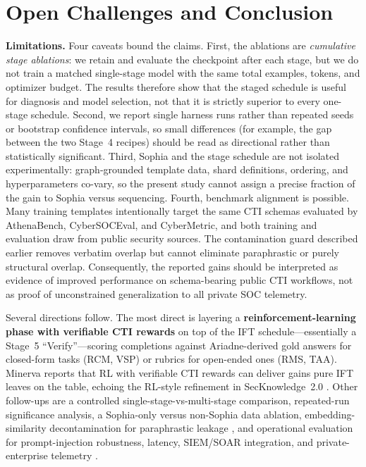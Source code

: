 \documentclass[conference]{IEEEtran}
\begin{document}
\section{Open Challenges and Conclusion}
\label{sec:open-challenges}

\textbf{Limitations.} Four caveats bound the claims. First, the ablations are \emph{cumulative stage ablations}: we retain and evaluate the checkpoint after each stage, but we do not train a matched single-stage model with the same total examples, tokens, and optimizer budget. The results therefore show that the staged schedule is useful for diagnosis and model selection, not that it is strictly superior to every one-stage schedule. Second, we report single harness runs rather than repeated seeds or bootstrap confidence intervals, so small differences (for example, the gap between the two Stage~4 recipes) should be read as directional rather than statistically significant. Third, Sophia and the stage schedule are not isolated experimentally: graph-grounded template data, shard definitions, ordering, and hyperparameters co-vary, so the present study cannot assign a precise fraction of the gain to Sophia versus sequencing. Fourth, benchmark alignment is possible. Many training templates intentionally target the same CTI schemas evaluated by AthenaBench, CyberSOCEval, and CyberMetric, and both training and evaluation draw from public security sources. The contamination guard described earlier removes verbatim overlap but cannot eliminate paraphrastic or purely structural overlap. Consequently, the reported gains should be interpreted as evidence of improved performance on schema-bearing public CTI workflows, not as proof of unconstrained generalization to all private SOC telemetry.

Several directions follow. The most direct is layering a \textbf{reinforcement-learning phase with verifiable CTI rewards} on top of the IFT schedule---essentially a Stage~5 ``Verify''---scoring completions against Ariadne-derived gold answers for closed-form tasks (RCM, VSP) or rubrics for open-ended ones (RMS, TAA). Minerva \cite{minerva2026} reports that RL with verifiable CTI rewards can deliver gains pure IFT leaves on the table, echoing the RL-style refinement in SecKnowledge~2.0 \cite{levi2025toward}. Other follow-ups are a controlled single-stage-vs-multi-stage comparison, repeated-run significance analysis, a Sophia-only versus non-Sophia data ablation, embedding-similarity decontamination for paraphrastic leakage \cite{yang2023contamination,groeneveld2024olmo}, and operational evaluation for prompt-injection robustness, latency, SIEM/SOAR integration, and private-enterprise telemetry \cite{hu2024seceval,liu2024cyberbench,athenabench2025}.
\end{document}
